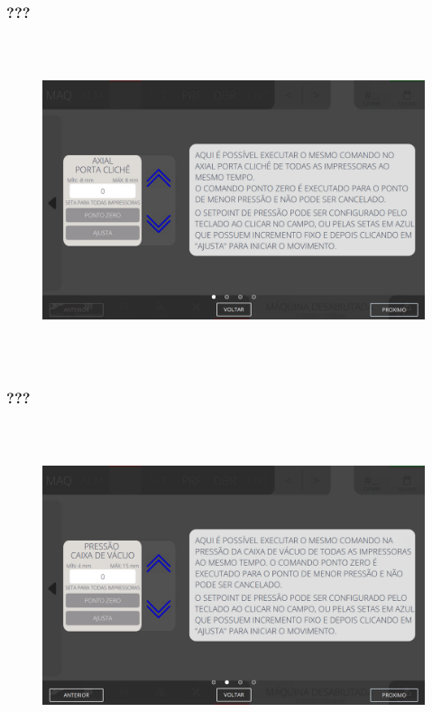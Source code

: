 \newpage
\thispagestyle{fancy}
\vspace*{\fill}
\subsubsection{\small{???}}
\begin{figure}[h]
  \centering
  \includegraphics[width=576px,height=360px]{src/imagesFlexo/04-printter/01-printters/settings/e-9.png}
   \label{}
\end{figure}
\vspace*{\fill}

\newpage
\thispagestyle{fancy}
\vspace*{\fill}
\subsubsection{\small{???}}
\begin{figure}[h]
  \centering
  \includegraphics[width=576px,height=360px]{src/imagesFlexo/04-printter/01-printters/settings/e-10.png}
   \label{}
\end{figure}
\vspace*{\fill}

